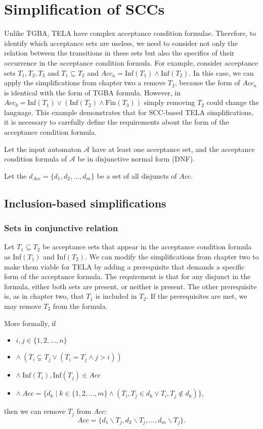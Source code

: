 \documentclass[
  digital, %
  twoside, %
  table,   %
  lof,     %
  lot,     %
]{fithesis3}
\begin{document}
\section{Simplification of SCCs}
Unlike TGBA, TELA have complex acceptance condition formulae. Therefore, to identify which acceptance sets are useless, we need to consider not only the relation between the transitions in these sets but also the specifics of their occurrence in the acceptance condition formula. For example, consider acceptance sets $T_1, T_2, T_3$ and $T_1 \subseteq T_2$ and $Acc_a = \text{Inf}(T_1) \wedge \text{Inf}(T_2)$. In this case, we can apply the simplifications from chapter two a remove $T_2$, because the form of $Acc_a$ is identical with the form of TGBA formula. However, in $Acc_b = \text{Inf}(T_1) \vee (\text{Inf}(T_2) \wedge \text{Fin}(T_3))$ simply removing $T_2$ could change the language. This example demonstrates that for SCC-based TELA simplifications, it is necessary to carefully define the requirements about the form of the acceptance condition formula.

Let the input automaton $\mathcal{A}$ have at least one acceptance set, and the acceptance condition formula of $\mathcal{A}$ be in disjunctive normal form (DNF). 

Let the $d_{Acc} = \{d_1, d_2, \dots, d_m\}$ be a set of all disjuncts of $Acc$.


\subsection{Inclusion-based simplifications}
\subsubsection{Sets in conjunctive relation}
Let $T_1 \subseteq T_2$ be acceptance sets that appear in the acceptance condition formula as Inf$(T_1)$ and Inf$(T_2)$. We can modify the simplifications from chapter two to make them viable for TELA by adding a prerequisite that demands a specific form of the acceptance formula. The requirement is that for any disjunct in the formula, either both sets are present, or neither is present. The other prerequisite is, as in chapter two, that $T_1$ is included in $T_2$. If the prerequisites are met, we may remove $T_2$ from the formula. 

More formally, if 
\begin{itemize}
  \item $i, j \in \{1, 2, \dots, n\}$
  \item $\wedge \ (T_i \subsetneq T_j \vee (T_i = T_j \wedge j > i))$
  \item $\wedge \ \text{Inf}(T_i), \text{Inf}(T_j) \in Acc$
  \item $\wedge \ Acc = \{ d_k \mid k \in \{1, 2, \dots, m\} \wedge (T_i, T_j \in d_k \vee T_i, T_j \notin d_k)\}$,
\end{itemize}
then we can remove $T_j$ from $Acc$: 
\begin{equation*}
  Acc = \{d_1 \smallsetminus T_j, d_2 \smallsetminus T_j, \dots, d_m \smallsetminus T_j\}.
\end{equation*} 
\end{document}
